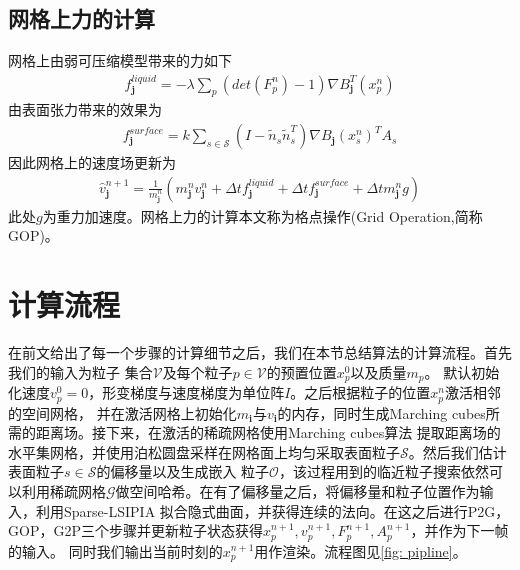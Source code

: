 \subsection{网格上力的计算}
网格上由弱可压缩模型带来的力如下
\begin{align}
    f^{liquid}_{\mathbf{j}} = -\lambda \sum_p (det(F_p^n) - 1)\nabla B_{\mathbf{j}}^T(x_p^n)
\end{align}
由表面张力带来的效果为
\begin{align}
    f^{surface}_{\mathbf{j}} = k \sum_{s\in\mathcal{S}}(I - \tilde{n}_s\tilde{n}_s^T)\nabla B_{\mathbf{j}}(x_s^n)^TA_s
\end{align}
因此网格上的速度场更新为
\begin{align}
    \hat{v}_{\mathbf{j}}^{n+1} = \frac{1}{m_\mathbf{j}^n}(m_{\mathbf{j}}^nv_{\mathbf{j}}^n + \Delta t f^{liquid}_{\mathbf{j}} + \Delta t f^{surface}_{\mathbf{j}} +\Delta t m_\mathbf{j}^n g)
\end{align}
此处$g$为重力加速度。网格上力的计算本文称为格点操作(Grid Operation,简称GOP)。
\section{计算流程}
在前文给出了每一个步骤的计算细节之后，我们在本节总结算法的计算流程。首先我们的输入为粒子
集合$\mathcal{V}$及每个粒子$p\in\mathcal{V}$的预置位置$x_p^0$以及质量$m_p$。
默认初始化速度$v_p^0 = 0$，形变梯度与速度梯度为单位阵$I$。之后根据粒子的位置$x_p^n$激活相邻的空间网格，
并在激活网格上初始化$m_\mathbf{i}$与$v_\mathbf{i}$的内存，同时生成Marching cubes所需的距离场。接下来，在激活的稀疏网格使用Marching cubes算法
提取距离场的水平集网格，并使用泊松圆盘采样在网格面上均匀采取表面粒子$\mathcal{S}$。然后我们估计表面粒子$s\in \mathcal{S}$的偏移量以及生成嵌入
粒子$\mathcal{O}$，该过程用到的临近粒子搜索依然可以利用稀疏网格$\mathcal{G}$做空间哈希。在有了偏移量之后，将偏移量和粒子位置作为输入，利用Sparse-LSIPIA
拟合隐式曲面，并获得连续的法向。在这之后进行P2G，GOP，G2P三个步骤并更新粒子状态获得$x_p^{n+1},v_p^{n+1},F_p^{n+1},A_p^{n+1}$，并作为下一帧的输入。
同时我们输出当前时刻的$x_p^{n+1}$用作渲染。流程图见\ref{fig: pipline}。


